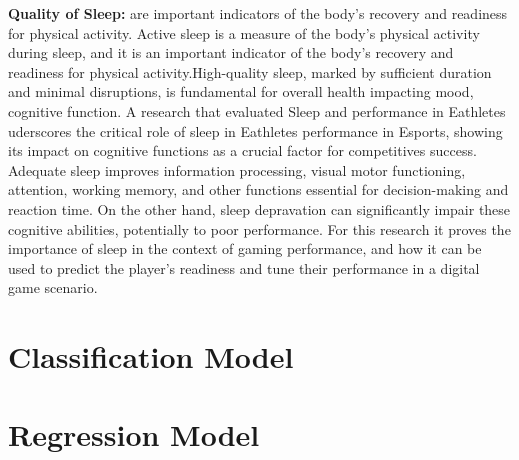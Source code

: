     \textbf{Quality of Sleep:} are important indicators of the body's recovery and readiness for physical activity. Active sleep is a 
    measure of the body's physical activity during sleep, and it is an important indicator of the body's recovery and readiness for 
    physical activity.High-quality sleep, marked by sufficient duration and minimal disruptions, is fundamental for overall health 
    impacting mood, cognitive function.  A research that evaluated Sleep and performance in Eathletes \cite{BONNAR2019647} uderscores the 
    critical role of sleep in Eathletes performance in Esports, showing its impact on cognitive functions as a crucial factor for 
    competitives success. Adequate sleep improves information processing, visual motor functioning, attention, working memory, and other 
    functions essential for decision-making and reaction time. On the other hand, sleep depravation can significantly impair these 
    cognitive abilities, potentially to poor performance. For this research it proves the importance of sleep in the context of gaming 
    performance, and how it can be used to predict the player's readiness and tune their performance in a digital game scenario.

    \section{Classification Model}
    \section{Regression Model}

    
    
    

    

    
